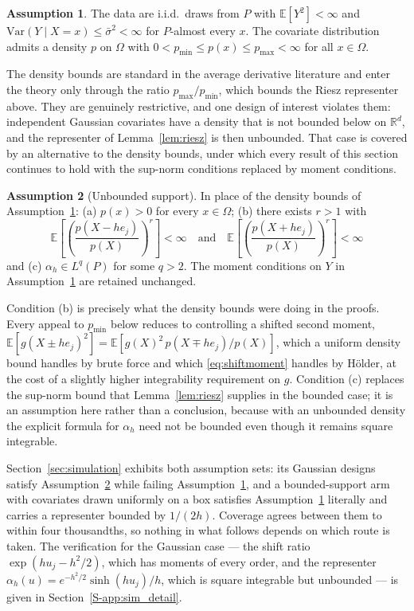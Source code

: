 \documentclass[12pt,a4paper]{article}
\numberwithin{equation}{section}
\theoremstyle{plain}
\theoremstyle{definition}
\newtheorem{assumption}{Assumption}
\newcommand{\R}{\mathbb{R}}
\newcommand{\E}{\mathbb{E}}
\begin{document}
	\begin{assumption}
		\label{ass:sampling}
		The data are i.i.d.\ draws from $P$ with $\E[Y^2] < \infty$ and
		$\mathrm{Var}(Y \mid X = x) \leq \bar{\sigma}^2 < \infty$ for $P$-almost every
		$x$. The covariate distribution admits a density $p$ on $\Omega$ with
		$0 < p_{\min} \leq p(x) \leq p_{\max} < \infty$ for all $x \in \Omega$.
	\end{assumption}
	The density bounds are standard in the average derivative literature
	\citep{powell1989, newey1993} and enter the theory only through the ratio
	$p_{\max}/p_{\min}$, which bounds the Riesz representer above. They are
	genuinely restrictive, and one design of interest violates them: independent
	Gaussian covariates have a density that is not bounded below on $\R^d$, and
	the representer of Lemma~\ref{lem:riesz} is then unbounded. That case is
	covered by an alternative to the density bounds, under which every result of
	this section continues to hold with the sup-norm conditions replaced by
	moment conditions.

	\begin{assumption}[Unbounded support]
		\label{ass:unbounded}
		In place of the density bounds of Assumption~\ref{ass:sampling}: (a)
		$p(x) > 0$ for every $x \in \Omega$; (b) there exists $r > 1$ with
		\begin{equation}
			\E\left[\left(\frac{p(X - h e_j)}{p(X)}\right)^{r}\right] < \infty
			\quad\text{and}\quad
			\E\left[\left(\frac{p(X + h e_j)}{p(X)}\right)^{r}\right] < \infty
			\label{eq:shiftmoment}
		\end{equation}
		and (c) $\alpha_h \in L^{q}(P)$ for some $q > 2$. The moment conditions on
		$Y$ in Assumption~\ref{ass:sampling} are retained unchanged.
	\end{assumption}
	Condition (b) is precisely what the density bounds were doing in the proofs.
	Every appeal to $p_{\min}$ below reduces to controlling a shifted second
	moment, $\E[g(X \pm h e_j)^2] = \E[g(X)^2\, p(X \mp h e_j)/p(X)]$, which a
	uniform density bound handles by brute force and which
	\eqref{eq:shiftmoment} handles by H\"{o}lder, at the cost of a slightly
	higher integrability requirement on $g$. Condition (c) replaces the sup-norm
	bound that Lemma~\ref{lem:riesz} supplies in the bounded case; it is an
	assumption here rather than a conclusion, because with an unbounded density
	the explicit formula for $\alpha_h$ need not be bounded even though it
	remains square integrable.

	Section~\ref{sec:simulation} exhibits both assumption sets: its Gaussian
	designs satisfy Assumption~\ref{ass:unbounded} while failing
	Assumption~\ref{ass:sampling}, and a bounded-support arm with covariates
	drawn uniformly on a box satisfies Assumption~\ref{ass:sampling} literally
	and carries a representer bounded by $1/(2h)$. Coverage agrees between them
	to within four thousandths, so nothing in what follows depends on which route
	is taken. The verification for the Gaussian case --- the shift ratio
	$\exp(h u_j - h^2/2)$, which has moments of every order, and the representer
	$\alpha_h(u) = e^{-h^2/2}\sinh(h u_j)/h$, which is square integrable but
	unbounded --- is given in Section~\ref{S-app:sim_detail}.
\end{document}
